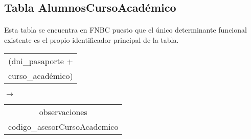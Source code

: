 \subsection{Tabla AlumnosCursoAcadémico}

  \paragraph{}Esta tabla se encuentra en FNBC puesto que el único
  determinante funcional existente es el propio identificador principal
  de la tabla.

 \begin{center}
    \begin{minipage}{4.2cm}{\begin{flushright}\begin{tabular}{ | c | }
                  \hline
                  (dni\_pasaporte + \\
                  curso\_académico) \\
                  \hline
                 \end{tabular}\end{flushright} }
    \end{minipage}
    \begin{minipage}{0.7cm}{$\longrightarrow$}
    \end{minipage}
    \begin{minipage}{5.9cm}{\begin{tabular}{ | c | }
                  \hline
                  observaciones \\
                  codigo\_asesorCursoAcademico \\
                  \hline
                 \end{tabular} }
    \end{minipage}
  \end{center}
